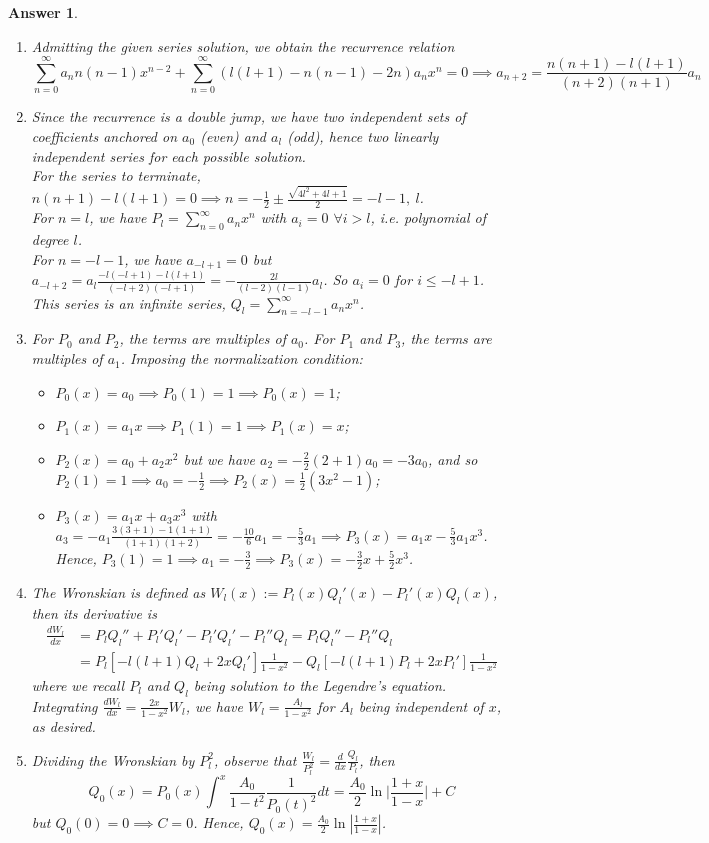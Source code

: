 \documentclass[a4paper]{article}
\newtheorem{ans}{Answer}[section]
\theoremstyle{new}
\begin{document}
\begin{ans}\leavevmode
\begin{enumerate}[label=(\alph*)]
\item Admitting the given series solution, we obtain the recurrence relation
$$\sum_{n=0}^\infty a_nn(n-1)x^{n-2}+\sum_{n=0}^\infty (l(l+1)-n(n-1)-2n)a_nx^n=0\implies a_{n+2}=\frac{n(n+1)-l(l+1)}{(n+2)(n+1)}a_n$$
\item Since the recurrence is a double jump, we have two independent sets of coefficients anchored on $a_0$ (even) and $a_l$ (odd), hence two linearly independent series for each possible solution.\\[5pt]
For the series to terminate, $n(n+1)-l(l+1)=0\implies n=-\frac{1}{2}\pm\frac{\sqrt{4l^2+4l+1}}{2}=-l-1,~l$.\\[5pt]
For $n=l$, we have $P_l=\sum_{n=0}^\infty a_nx^n$ with $a_i=0$ $\forall i>l$, i.e. polynomial of degree $l$.\\[5pt]
For $n=-l-1$, we have $a_{-l+1}=0$ but $a_{-l+2}=a_l\frac{-l(-l+1)-l(l+1)}{(-l+2)(-l+1)}=-\frac{2l}{(l-2)(l-1)}a_l$. So $a_i=0$ for $i\leq -l+1$. This series is an infinite series, $Q_l=\sum_{n=-l-1}^\infty a_nx^n$. 
\item For $P_0$ and $P_2$, the terms are multiples of $a_0$. For $P_1$ and $P_3$, the terms are multiples of $a_1$. Imposing the normalization condition:
\begin{itemize}
    \item $P_0(x)=a_0\implies P_0(1)=1\implies P_0(x)=1$;
    \item $P_1(x)=a_1x\implies P_1(1)=1\implies P_1(x)=x$;
    \item $P_2(x)=a_0+a_2x^2$ but we have $a_2=-\frac{2}{2}(2+1)a_0=-3a_0$, and so $P_2(1)=1\implies a_0=-\frac{1}{2}\implies P_2(x)=\frac{1}{2}(3x^2-1)$;
    \item  $P_3(x)=a_1x+a_3x^3$ with $a_3=-a_1\frac{3(3+1)-1(1+1)}{(1+1)(1+2)}=-\frac{10}{6}a_1=-\frac{5}{3}a_1\implies P_3(x)=a_1x-\frac{5}{3}a_1x^3$. Hence, $P_3(1)=1\implies a_1=-\frac{3}{2}\implies P_3(x)=-\frac{3}{2}x+\frac{5}{2}x^3$.
\end{itemize}
\item The Wronskian is defined as $W_l(x):=P_l(x)Q_l'(x)-P_l'(x)Q_l(x)$, then its derivative is
\begin{align}
\frac{dW_l}{dx}&=P_lQ_l''+P_l'Q_l'-P_l'Q_l'-P_l''Q_l=P_lQ_l''-P_l''Q_l\nonumber\\&=P_l[-l(l+1)Q_l+2xQ_l']\frac{1}{1-x^2}-Q_l[-l(l+1)P_l+2xP_l']\frac{1}{1-x^2}\nonumber
\end{align}
where we recall $P_l$ and $Q_l$ being solution to the Legendre's equation. Integrating $\frac{dW_l}{dx}=\frac{2x}{1-x^2}W_l$, we have $W_l=\frac{A_l}{1-x^2}$ for $A_l$ being independent of $x$, as desired.
\item Dividing the Wronskian by $P_l^2$, observe that $\frac{W_l}{P_l^2}=\frac{d}{dx}\frac{Q_l}{P_l}$, then 
$$Q_0(x)=P_0(x)\int^x\frac{A_0}{1-t^2}\frac{1}{P_0(t)^2}dt=\frac{A_0}{2}\ln\bigg|\frac{1+x}{1-x}\bigg|+C$$
but $Q_0(0)=0\implies C=0$. Hence, $Q_0(x)=\frac{A_0}{2}\ln|\frac{1+x}{1-x}|$.
\end{enumerate}
\end{ans}
\end{document}
